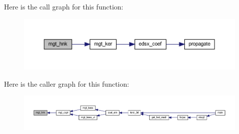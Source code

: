 Here is the call graph for this function\+:\nopagebreak
\begin{figure}[H]
\begin{center}
\leavevmode
\includegraphics[width=350pt]{Leroi_8f90_a8765868cf7e593af1ecbeadd492b6b49_cgraph}
\end{center}
\end{figure}
Here is the caller graph for this function\+:\nopagebreak
\begin{figure}[H]
\begin{center}
\leavevmode
\includegraphics[width=350pt]{Leroi_8f90_a8765868cf7e593af1ecbeadd492b6b49_icgraph}
\end{center}
\end{figure}
\mbox{\label{Leroi_8f90_ad35190cbd2113592b83c9f1e721b8d07}} 
